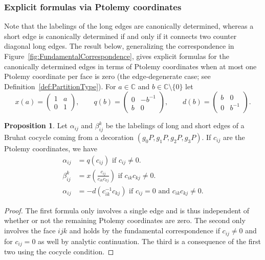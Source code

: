 \documentclass[11pt]{amsart}
\theoremstyle{plain}
\theoremstyle{definition}
\newtheorem{proposition}[theorem]{Proposition}
\numberwithin{equation}{section}
\newcommand{\C}{\mathbb C}
\begin{document}
\subsubsection{Explicit formulas via Ptolemy coordinates}  Note that the labelings of the long edges are canonically determined, whereas a short edge is canonically determined if and only if it connects two counter diagonal long edges. The result below, generalizing the correspondence in Figure~\ref{fig:FundamentalCorrespondence}, gives explicit formulas for the canonically determined edges in terms of Ptolemy coordinates when at most one Ptolemy coordinate per face is zero (the edge-degenerate case; see Definition~\ref{def:PartitionType}). For $a\in\C$ and $b\in\C\setminus\{0\}$ let 
\begin{equation}
x(a)=\begin{pmatrix}1&a\\0&1\end{pmatrix},\qquad q(b)=\begin{pmatrix}0&-b^{-1}\\b&0\end{pmatrix}, \qquad d(b)=\begin{pmatrix}b&0\\0&b^{-1}\end{pmatrix}.
\end{equation}

\begin{proposition}\label{prop:ConcreteFormula} Let $\alpha_{ij}$ and $\beta^k_{ij}$ be the labelings of long and short edges of a Bruhat cocycle coming from a decoration $(g_0P,g_1P,g_2P,g_3P)$. If $c_{ij}$ are the Ptolemy coordinates, we have
\begin{equation}
\begin{aligned}
\alpha_{ij}&=q(c_{ij})\text{ if } c_{ij}\neq 0.\\
\beta_{ij}^k&=x(\frac{c_{ij}}{c_{ik}c_{kj}}) \text{ if }c_{ik}c_{kj}\neq 0.\\
\alpha_{ij}&=-d(c_{ik}^{-1}c_{kj}) \text{ if } c_{ij}=0\text{ and } c_{ik}c_{kj}\neq 0.
\end{aligned}
\end{equation}
\end{proposition}
\begin{proof}
The first formula only involves a single edge and is thus independent of whether or not the remaining Ptolemy coordinates are zero. The second only involves the face $ijk$ and holds by the fundamental correspondence if $c_{ij}\neq 0$ and for $c_{ij}=0$ as well by analytic continuation. The third is a consequence of the first two using the cocycle condition. 
\end{proof}
\end{document}
